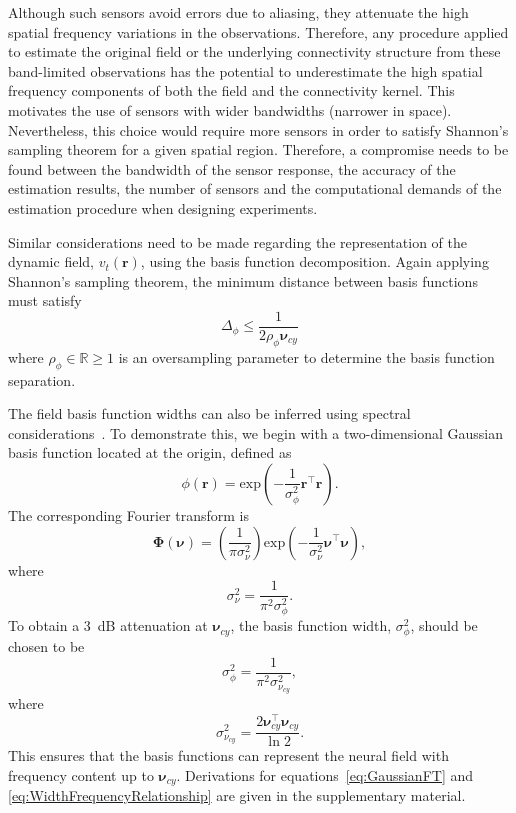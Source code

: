 \documentclass[12pt]{iopart}
\begin{document}
Although such sensors avoid errors due to aliasing, they attenuate the high spatial frequency variations in the observations. Therefore, any procedure applied to estimate the original field or the underlying connectivity structure from these band-limited observations has the potential to underestimate the high spatial frequency components of both the field and the connectivity kernel. This motivates the use of sensors with wider bandwidths (narrower in space). Nevertheless, this choice would require more sensors in order to satisfy Shannon's sampling theorem for a given spatial region. Therefore, a compromise needs to be found between the bandwidth of the sensor response, the accuracy of the estimation results, the number of sensors and the computational demands of the estimation procedure when designing experiments.

Similar considerations need to be made regarding the representation of the dynamic field, $v_t(\mathbf{r})$, using the basis function decomposition. Again applying Shannon's sampling theorem, the minimum distance between basis functions must satisfy 
\begin{equation}\label{eq:BasisFunctionSeparation}
	\Delta_{\phi} \leq \frac{1}{2\rho_{\phi}\boldsymbol{\nu}_{cy}}
\end{equation}
where $\rho_{\phi} \in \mathbb{R} \ge 1$ is an oversampling parameter to determine the basis function separation. 

The field basis function widths can also be inferred using spectral considerations~\cite{Sanner1992,Scerri2009}. To demonstrate this, we begin with a two-dimensional Gaussian basis function located at the origin, defined as
\begin{equation}\label{eq:BasisFunctionAtOrigin}
 \phi(\mathbf r)=\mathrm{exp}\left({-\frac{1}{\sigma_{\phi}^2} \mathbf r^\top\mathbf r}\right).
\end{equation}
The corresponding Fourier transform is
\begin{equation}\label{eq:GaussianFT}
\boldsymbol\Phi(\boldsymbol \nu)=\left(\frac{1}{\pi\sigma_{\nu}^2}\right)\mathrm{exp}\left(-\frac{1}{\sigma_{\nu}^2}\boldsymbol\nu^\top \boldsymbol\nu\right),
\end{equation}
where 
\begin{equation}\label{eq:GaussianFTWidth}
	\sigma^2_{\nu} = \frac{1}{\pi^2\sigma_{\phi}^2}. 
\end{equation}
To obtain a 3~dB attenuation at $\boldsymbol\nu_{cy}$, the basis function width, $\sigma^2_{\phi}$, should be chosen to be
\begin{equation}\label{eq:WidthCutOffRelationship}
 \sigma^2_{\phi}= \frac{1}{\pi^2\sigma_{\nu_{cy}}^2},
\end{equation}
where
\begin{equation}\label{eq:WidthFrequencyRelationship}
 \sigma^2_{\nu_{cy}}= \frac{2\boldsymbol\nu_{cy}^\top \boldsymbol\nu_{cy}}{\ln2}.
\end{equation}
This ensures that the basis functions can represent the neural field with frequency content up to $\boldsymbol\nu_{cy}$. Derivations for equations~\ref{eq:GaussianFT} and \ref{eq:WidthFrequencyRelationship} are given in the supplementary material.
\end{document}
